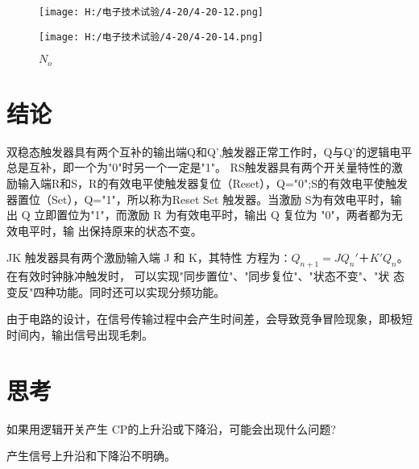 \documentclass{article}
\begin{document}
\begin{figure}[h]
  \begin{minipage}[t]{0.5\linewidth} %
    \centering   
    \texttt{[image: H:/电子技术试验/4-20/4-20-12.png]}   
    \caption{$I_{EH}$}   
    \label{fig:side:a}   
  \end{minipage}%
  \begin{minipage}[t]{0.5\linewidth}   
    \centering   
    \texttt{[image: H:/电子技术试验/4-20/4-20-14.png]}   
    \caption{$N_o$}   
    \label{fig:side:b}   
  \end{minipage}   
\end{figure}
  
  \newpage
\section{结论}
双稳态触发器具有两个互补的输出端Q和Q',触发器正常工作时，Q与Q'的逻辑电平总是互补，即一个为"0"时另一个一定是"1"。
RS触发器具有两个开关量特性的激励输入端R和S，R的有效电平使触发器复位（Reset），Q="0";S的有效电平使触发器置位（Set），Q="1"，所以称为Reset Set 触发器。当激励 S为有效电平时，输出 Q 立即置位为"1"，而激励 R 为有效电平时，输出 Q 复位为
"0"，两者都为无效电平时，输 出保持原来的状态不变。\par
JK 触发器具有两个激励输入端 J 和 K，其特性
方程为∶$Q_{n+1}=JQ_n'＋K'Q_n$。在有效时钟脉冲触发时，
可以实现"同步置位"、"同步复位"、"状态不变"、"状
态变反"四种功能。同时还可以实现分频功能。
\par 
由于电路的设计，在信号传输过程中会产生时间差，会导致竞争冒险现象，即极短时间内，输出信号出现毛刺。


\section{思考}
如果用逻辑开关产生 CP的上升沿或下降沿，可能会出现什么问题?\par
产生信号上升沿和下降沿不明确。
\newpage
\end{document}
